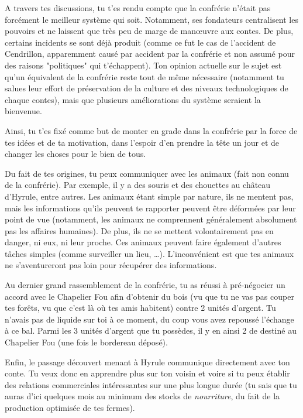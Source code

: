{	\par A travers tes discussions, tu t'es rendu compte que la confrérie n'était pas forcément le meilleur système qui soit. Notamment, ses fondateurs centralisent les pouvoirs et ne laissent que très peu de marge de manœuvre aux contes. De plus, certains incidents se sont déjà produit (comme ce fut le cas de l'accident de Cendrillon, apparemment causé par accident par la confrérie et non assumé pour des raisons "politiques" qui t'échappent). Ton opinion actuelle sur le sujet est qu'un équivalent de la confrérie reste tout de même nécessaire (notamment tu salues leur effort de préservation de la culture et des niveaux technologiques de chaque contes), mais que plusieurs améliorations du système seraient la bienvenue.
	
	\par Ainsi, tu t'es fixé comme but de monter en grade dans la confrérie par la force de tes idées et de ta motivation, dans l'espoir d'en prendre la tête un jour et de changer les choses pour le bien de tous.
	
	\par Du fait de tes origines, tu peux communiquer avec les animaux (fait non connu de la confrérie). Par exemple, il y a des souris et des chouettes au château d'Hyrule, entre autres. Les animaux étant simple par nature, ils ne mentent pas, mais les informations qu'ils peuvent te rapporter peuvent être déformées par leur point de vue (notamment, les animaux ne comprennent généralement absolument pas les affaires humaines). De plus, ils ne se mettent volontairement pas en danger, ni eux, ni leur proche. Ces animaux peuvent faire également d'autres tâches simples (comme surveiller un lieu, \dots). L'inconvénient est que tes animaux ne s'aventureront pas loin pour récupérer des informations.
	
	\par Au dernier grand rassemblement de la confrérie, tu as réussi à pré-négocier un accord avec le Chapelier Fou afin d'obtenir du bois (vu que tu ne vas pas couper tes forêts, vu que c'est là où tes amis habitent) contre 2 unités d'argent. Tu n'avais pas de liquide sur toi à ce moment, du coup vous avez repoussé l'échange à ce bal. Parmi les 3 unités d'argent que tu possèdes, il y en ainsi 2 de destiné au Chapelier Fou (une fois le bordereau déposé).
	
	\par Enfin, le passage découvert menant à Hyrule communique directement avec ton conte. Tu veux donc en apprendre plus sur ton voisin et voire si tu peux établir des relations commerciales intéressantes sur une plus longue durée (tu sais que tu auras d'ici quelques mois au minimum des stocks de \emph{nourriture}, du fait de la production optimisée de tes fermes).
}


